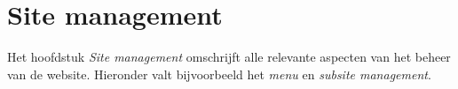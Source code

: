 
\section{Site management}\label{sitemanagement}

Het hoofdstuk \emph{Site management} omschrijft alle relevante aspecten van het beheer van de website. Hieronder valt bijvoorbeeld het \emph{menu} en \emph{subsite management}.














